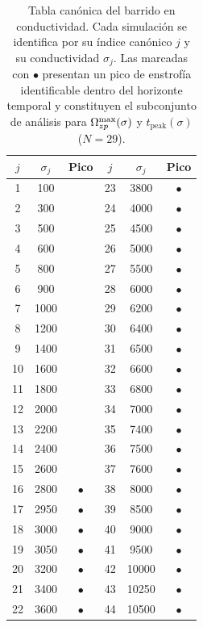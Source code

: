 \begin{table}[H]
\centering
\caption{Tabla canónica del barrido en conductividad. Cada simulación se identifica por su índice canónico $j$ y su conductividad $\sigma_j$. Las marcadas con $\bullet$ presentan un pico de enstrofía identificable dentro del horizonte temporal y constituyen el subconjunto de análisis para $\Omega_{zp}^{\max}(\sigma)$ y $t_{\mathrm{peak}}(\sigma)$ ($N = 29$).}
\label{tab:canonica_sigma}
\small
\begin{tabular}{|c|c|c||c|c|c|}
\hline
$j$ & $\sigma_j$ & Pico & $j$ & $\sigma_j$ & Pico \\
\hline
1  & 100   &              & 23 & 3800   & $\bullet$ \\
2  & 300   &              & 24 & 4000   & $\bullet$ \\
3  & 500   &              & 25 & 4500   & $\bullet$ \\
4  & 600   &              & 26 & 5000   & $\bullet$ \\
5  & 800   &              & 27 & 5500   & $\bullet$ \\
6  & 900   &              & 28 & 6000   & $\bullet$ \\
7  & 1000  &              & 29 & 6200   & $\bullet$ \\
8  & 1200  &              & 30 & 6400   & $\bullet$ \\
9  & 1400  &              & 31 & 6500   & $\bullet$ \\
10 & 1600  &              & 32 & 6600   & $\bullet$ \\
11 & 1800  &              & 33 & 6800   & $\bullet$ \\
12 & 2000  &              & 34 & 7000   & $\bullet$ \\
13 & 2200  &              & 35 & 7400   & $\bullet$ \\
14 & 2400  &              & 36 & 7500   & $\bullet$ \\
15 & 2600  &              & 37 & 7600   & $\bullet$ \\
16 & 2800  & $\bullet$    & 38 & 8000   & $\bullet$ \\
17 & 2950  & $\bullet$    & 39 & 8500   & $\bullet$ \\
18 & 3000  & $\bullet$    & 40 & 9000   & $\bullet$ \\
19 & 3050  & $\bullet$    & 41 & 9500   & $\bullet$ \\
20 & 3200  & $\bullet$    & 42 & 10000  & $\bullet$ \\
21 & 3400  & $\bullet$    & 43 & 10250  & $\bullet$ \\
22 & 3600  & $\bullet$    & 44 & 10500  & $\bullet$ \\
\hline
\end{tabular}
\end{table}

